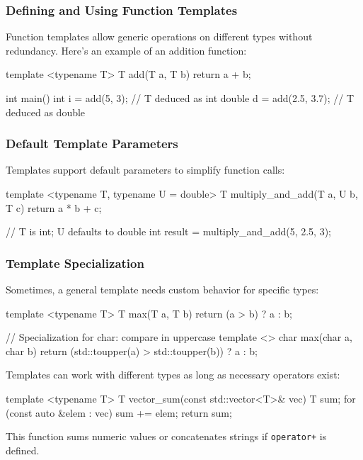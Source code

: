 \subsubsection{Defining and Using Function Templates}
Function templates allow generic operations on different types without redundancy. Here's an example of an addition function:

\vspace{-0.5em}

\begin{codeblock}[language=C++]
template <typename T>
T add(T a, T b) { return a + b; }

int main() {
    int i = add(5, 3);        // T deduced as int
    double d = add(2.5, 3.7); // T deduced as double
}
\end{codeblock}

\vspace{-0.5em}

\subsubsection{Default Template Parameters}
Templates support default parameters to simplify function calls:

\vspace{-0.5em}

\begin{codeblock}[language=C++]
template <typename T, typename U = double>
T multiply_and_add(T a, U b, T c) {
    return a * b + c;
}

// T is int; U defaults to double
int result = multiply_and_add(5, 2.5, 3);
\end{codeblock}

\subsubsection{Template Specialization}
Sometimes, a general template needs custom behavior for specific types:

\begin{codeblock}[language=C++]
template <typename T>
T max(T a, T b) { return (a > b) ? a : b; }

// Specialization for char: compare in uppercase
template <>
char max(char a, char b) {
    return (std::toupper(a) > std::toupper(b)) ? a : b;
}
\end{codeblock}

\begin{exampleblock}

Templates can work with different types as long as necessary operators exist:

\begin{codeblock}[language=C++]
template <typename T>
T vector_sum(const std::vector<T>& vec) {
    T sum{};
    for (const auto &elem : vec) sum += elem;
    return sum;
}
\end{codeblock}

This function sums numeric values or concatenates strings if \texttt{operator+} is defined.
\end{exampleblock}
